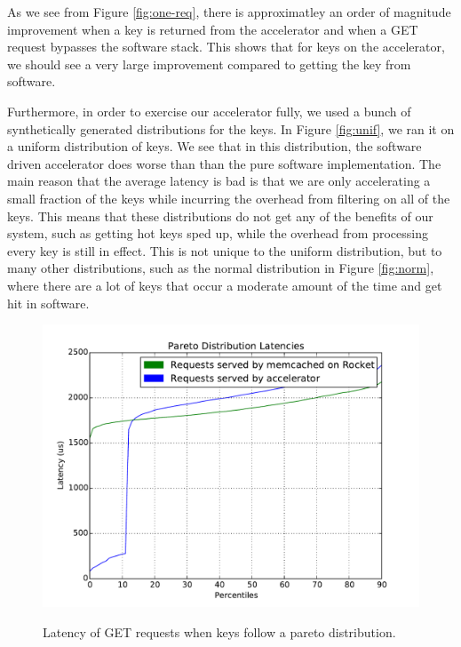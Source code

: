 As we see from Figure \ref{fig:one-req}, there is approximatley an order of magnitude
improvement when a key is returned from the accelerator and when a GET request
bypasses the software stack. This shows that for keys on the accelerator, we
should see a very large improvement compared to getting the key from software.

Furthermore, in order to exercise our accelerator fully, we used a bunch of
synthetically generated distributions for the keys. In Figure \ref{fig:unif},
we ran it on a uniform distribution of keys. We see that in this distribution,
the software driven accelerator does worse than than the pure software
implementation. The main reason that the average latency is bad is that we are
only accelerating a small fraction of the keys while incurring the overhead
from filtering on all of the keys. This means that these distributions do not
get any of the benefits of our system, such as getting hot keys sped up, while
the overhead from processing every key is still in effect. This is not unique
to the uniform distribution, but to many other distributions, such as the
normal distribution in Figure \ref{fig:norm}, where there are a lot of keys
that occur a moderate amount of the time and get hit in software.

\begin{figure}[t]
\begin{center}
\label{fig:pareto}
\includegraphics[width=\linewidth]{pareto.pdf}
\caption{Latency of GET requests when keys follow a pareto distribution.}
\end{center}
\end{figure}

